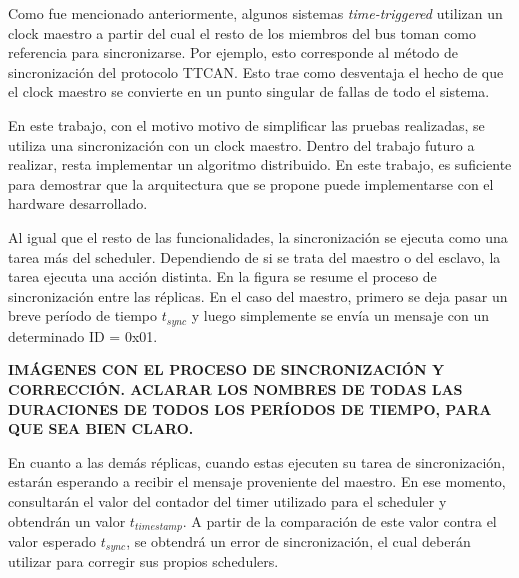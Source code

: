 Como fue mencionado anteriormente, algunos sistemas \textit{time-triggered} utilizan un clock maestro a partir del cual el resto de los miembros del bus toman como referencia para sincronizarse. Por ejemplo, esto corresponde al método de sincronización del protocolo TTCAN. Esto trae como desventaja el hecho de que el clock maestro se convierte en un punto singular de fallas de todo el sistema. 

En este trabajo, con el motivo motivo de simplificar las pruebas realizadas, se utiliza una sincronización con un clock maestro. Dentro del trabajo futuro a realizar, resta implementar un algoritmo distribuido. En este trabajo, es suficiente para demostrar que la arquitectura que se propone puede implementarse con el hardware desarrollado.


Al igual que el resto de las funcionalidades, la sincronización se ejecuta como una tarea más del scheduler. Dependiendo de si se trata del maestro o del esclavo, la tarea ejecuta una acción distinta. En la figura  se resume el proceso de sincronización entre las réplicas. En el caso del maestro, primero se deja pasar un breve período de tiempo $t_{sync}$ y luego simplemente se envía un mensaje con un determinado ID = 0x01.

{\Large \textbf{{\color{red} IMÁGENES CON EL PROCESO DE SINCRONIZACIÓN Y CORRECCIÓN. ACLARAR LOS NOMBRES DE TODAS LAS DURACIONES DE TODOS LOS PERÍODOS DE TIEMPO, PARA QUE SEA BIEN CLARO.}}}

En cuanto a las demás réplicas, cuando estas ejecuten su tarea de sincronización, estarán esperando a recibir el mensaje proveniente del maestro. En ese momento, consultarán el valor del contador del timer utilizado para el scheduler y obtendrán un valor $t_{timestamp}$. A partir de la comparación de este valor contra el valor esperado $t_{sync}$, se obtendrá un error de sincronización, el cual deberán utilizar para corregir sus propios schedulers.

